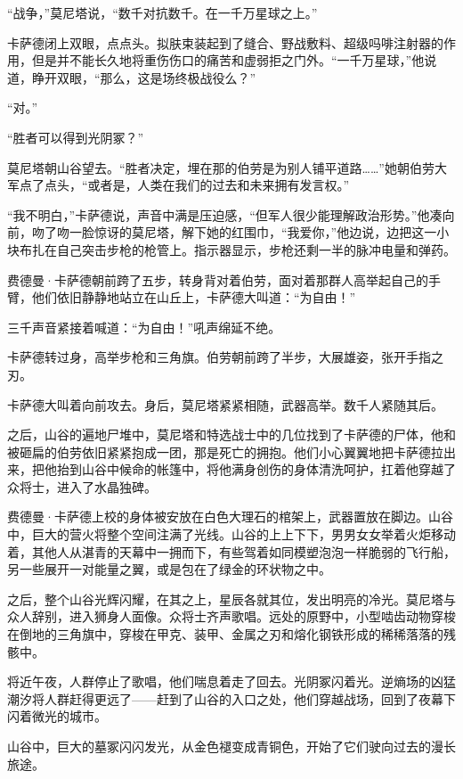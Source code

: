 \documentclass[AutoFakeBold=true]{book}
\begin{document}
``战争，''莫尼塔说，``数千对抗数千。在一千万星球之上。''

卡萨德闭上双眼，点点头。拟肤束装起到了缝合、野战敷料、超级吗啡注射器的作用，但是并不能长久地将重伤伤口的痛苦和虚弱拒之门外。``一千万星球，''他说道，睁开双眼，``那么，这是场终极战役么？''

``对。''

``胜者可以得到光阴冢？''

莫尼塔朝山谷望去。``胜者决定，埋在那的伯劳是为别人铺平道路……''她朝伯劳大军点了点头，``或者是，人类在我们的过去和未来拥有发言权。''

``我不明白，''卡萨德说，声音中满是压迫感，``但军人很少能理解政治形势。''他凑向前，吻了吻一脸惊讶的莫尼塔，解下她的红围巾，``我爱你，''他边说，边把这一小块布扎在自己突击步枪的枪管上。指示器显示，步枪还剩一半的脉冲电量和弹药。

费德曼·卡萨德朝前跨了五步，转身背对着伯劳，面对着那群人高举起自己的手臂，他们依旧静静地站立在山丘上，卡萨德大叫道：``为自由！''

三千声音紧接着喊道：``为自由！''吼声绵延不绝。

卡萨德转过身，高举步枪和三角旗。伯劳朝前跨了半步，大展雄姿，张开手指之刃。

卡萨德大叫着向前攻去。身后，莫尼塔紧紧相随，武器高举。数千人紧随其后。

\vspace*{1em}

之后，山谷的遍地尸堆中，莫尼塔和特选战士中的几位找到了卡萨德的尸体，他和被砸扁的伯劳依旧紧紧抱成一团，那是死亡的拥抱。他们小心翼翼地把卡萨德拉出来，把他抬到山谷中候命的帐篷中，将他满身创伤的身体清洗呵护，扛着他穿越了众将士，进入了水晶独碑。

费德曼·卡萨德上校的身体被安放在白色大理石的棺架上，武器置放在脚边。山谷中，巨大的营火将整个空间注满了光线。山谷的上上下下，男男女女举着火炬移动着，其他人从湛青的天幕中一拥而下，有些驾着如同模塑泡泡一样脆弱的飞行船，另一些展开一对能量之翼，或是包在了绿金的环状物之中。

之后，整个山谷光辉闪耀，在其之上，星辰各就其位，发出明亮的冷光。莫尼塔与众人辞别，进入狮身人面像。众将士齐声歌唱。远处的原野中，小型啮齿动物穿梭在倒地的三角旗中，穿梭在甲克、装甲、金属之刃和熔化钢铁形成的稀稀落落的残骸中。

将近午夜，人群停止了歌唱，他们喘息着走了回去。光阴冢闪着光。逆熵场的凶猛潮汐将人群赶得更远了——赶到了山谷的入口之处，他们穿越战场，回到了夜幕下闪着微光的城市。

山谷中，巨大的墓冢闪闪发光，从金色褪变成青铜色，开始了它们驶向过去的漫长旅途。
\end{document}
